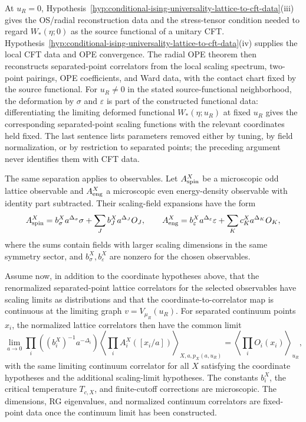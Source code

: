 At \(u_R=0\),
Hypothesis~\ref{hyp:conditional-ising-universality-lattice-to-cft-data}\textup{(iii)}
gives the OS/radial reconstruction data and the
stress-tensor condition needed to regard \(W_\ast(\eta;0)\) as the source
functional of a unitary CFT.
Hypothesis~\ref{hyp:conditional-ising-universality-lattice-to-cft-data}\textup{(iv)}
supplies the local CFT data and
OPE convergence.  The radial OPE theorem then reconstructs separated-point
correlators from the local scaling spectrum, two-point pairings, OPE
coefficients, and Ward data, with the contact chart fixed by the source
functional.  For \(u_R\neq0\) in the stated source-functional neighborhood,
the deformation by \(\sigma\) and \(\varepsilon\) is part of the constructed
functional data: differentiating the limiting deformed functional
\(W_\ast(\eta;u_R)\) at fixed \(u_R\) gives the corresponding separated-point
scaling functions with the relevant coordinates held fixed.  The last sentence lists
parameters removed either by tuning, by field normalization, or by restriction
to separated points; the preceding argument never identifies them with CFT
data.

The same separation applies to observables.  Let \(A^X_{\rm spin}\) be a
microscopic odd lattice observable and \(A^X_{\rm eng}\) a microscopic even
energy-density observable with identity part subtracted.  Their scaling-field
expansions have the form
\[
  A^X_{\rm spin}
  =
  b^X_\sigma a^{\Delta_\sigma}\sigma
  +
  \sum_J b^X_J a^{\Delta_J}O_J,
  \qquad
  A^X_{\rm eng}
  =
  b^X_\varepsilon a^{\Delta_\varepsilon}\varepsilon
  +
  \sum_K c^X_K a^{\Delta_K}O_K,
\]
where the sums contain fields with larger scaling dimensions in the same
symmetry sector, and \(b^X_\sigma,b^X_\varepsilon\) are nonzero for the
chosen observables.

Assume now, in addition to the coordinate hypotheses above, that the
renormalized separated-point lattice correlators for the selected observables
have scaling limits as distributions and that the coordinate-to-correlator map
is continuous at the limiting graph \(v=V_{\mu_R}(u_R)\).  For separated
continuum points \(x_i\), the normalized lattice correlators then have the
common limit
\[
  \lim_{a\to0}
  \prod_i
  \left((b^X_i)^{-1}a^{-\Delta_i}\right)
  \left\langle
    \prod_i A^X_i([x_i/a])
  \right\rangle_{X,a,p_X(a,u_R)}
  =
  \left\langle
    \prod_i O_i(x_i)
  \right\rangle_{u_R},
\]
with the same limiting continuum correlator for all \(X\) satisfying the
coordinate hypotheses and the additional scaling-limit hypotheses.  The
constants \(b^X_i\), the critical temperature \(T_{c,X}\), and finite-cutoff
corrections are microscopic.  The dimensions, RG eigenvalues, and normalized
continuum correlators are fixed-point data once the continuum limit has been
constructed.

